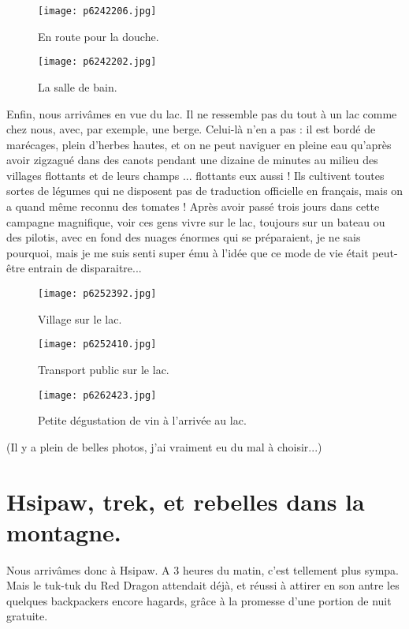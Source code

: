 \documentclass{book}
\begin{document}
\begin{figure}[h]
\centering
\texttt{[image: p6242206.jpg]}
\caption*{En route pour la douche.}
\end{figure}


\begin{figure}[h]
\centering
\texttt{[image: p6242202.jpg]}
\caption*{La salle de bain.}
\end{figure}

Enfin, nous arrivâmes en vue du lac. Il ne ressemble pas du tout à un lac comme chez nous, avec, par exemple, une berge. Celui-là n'en a pas : il est bordé de marécages, plein d'herbes hautes, et on ne peut naviguer en pleine eau qu'après avoir zigzagué dans des canots pendant une dizaine de minutes au milieu des villages flottants et de leurs champs ... flottants eux aussi ! Ils cultivent toutes sortes de légumes qui ne disposent pas de traduction officielle en français, mais on a quand même reconnu des tomates ! Après avoir passé trois jours dans cette campagne magnifique, voir ces gens vivre sur le lac, toujours sur un bateau ou des pilotis, avec en fond des nuages énormes qui se préparaient, je ne sais pourquoi, mais je me suis senti super ému à l'idée que ce mode de vie était peut-être entrain de disparaitre...






\begin{figure}[h]
\centering
\texttt{[image: p6252392.jpg]}
\caption*{Village sur le lac.}
\end{figure}


\begin{figure}[h]
\centering
\texttt{[image: p6252410.jpg]}
\caption*{Transport public sur le lac.}
\end{figure}


\begin{figure}[h]
\centering
\texttt{[image: p6262423.jpg]}
\caption*{Petite dégustation de vin à l'arrivée au lac.}
\end{figure}





 (Il y a plein de belles photos, j'ai vraiment eu du mal à choisir...)



\chapter{Hsipaw, trek, et rebelles dans la montagne.}
Nous arrivâmes donc à Hsipaw. A 3 heures du matin, c'est tellement plus sympa. Mais le tuk-tuk du Red Dragon attendait déjà, et réussi à attirer en son antre les quelques backpackers encore hagards, grâce à la promesse d'une portion de nuit gratuite.
\end{document}
